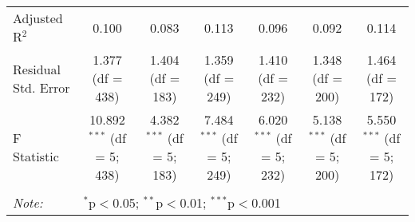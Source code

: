 \begin{table}[H]
\begin{tabular}{@{\extracolsep{5pt}}lcccccc}
Adjusted R$^{2}$ & 0.100 & 0.083 & 0.113 & 0.096 & 0.092 & 0.114 \\ 
Residual Std. Error & 1.377 (df = 438) & 1.404 (df = 183) & 1.359 (df = 249) & 1.410 (df = 232) & 1.348 (df = 200) & 1.464 (df = 172) \\ 
F Statistic & 10.892$^{***}$ (df = 5; 438) & 4.382$^{***}$ (df = 5; 183) & 7.484$^{***}$ (df = 5; 249) & 6.020$^{***}$ (df = 5; 232) & 5.138$^{***}$ (df = 5; 200) & 5.550$^{***}$ (df = 5; 172) \\ 
\hline 
\hline \\[-1.8ex] 
\textit{Note:}  & \multicolumn{6}{l}{$^{*}$p$<$0.05; $^{**}$p$<$0.01; $^{***}$p$<$0.001} \\ 
\end{tabular} 
\end{table} 
